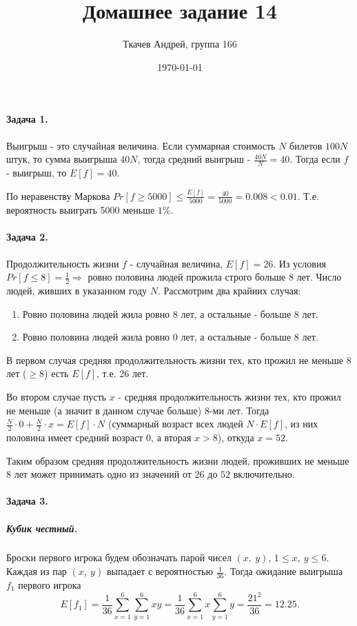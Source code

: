 \documentclass{article}
\title{Домашнее задание 14}
\author{Ткачев Андрей, группа 166}
\date{\today}
\newcommand{\pair}[2]{(#1,\ #2)}
\newcommand{\half}[1]{\frac{#1}{2}}
\begin{document}
	\maketitle
	\paragraph{Задача 1.}

    Выигрыш - это случайная величина. Если суммарная стоимость $N$ билетов $100N$ штук, то сумма выигрыша $40N$, тогда средний выигрыш - $\frac{40N}{N} = 40$. Тогда если $f$ - выигрыш, то $E[f] = 40$.

    По неравенству Маркова $Pr[f \ge 5000] \le \frac{E[f]}{5000} = \frac{40}{5000} = 0.008 < 0.01 $. Т.е. вероятность выиграть 5000 меньше $1\%$.

    \paragraph{Задача 2.}
    Продолжительность жизни $f$ - случайная величина, $E[f] = 26$. Из условия $Pr[f \le 8] = \half{1} \Rightarrow$ ровно половина людей прожила строго больше 8 лет.
    Число людей, живших в указанном году $N$. Рассмотрим два крайних случая:

    \begin{enumerate}
        \item Ровно половина людей жила ровно 8 лет, а остальные - больше 8 лет.
        \item Ровно половина людей жила ровно 0 лет, а остальные - больше 8 лет.
    \end{enumerate}

    В первом случая средняя продолжительность жизни тех, кто прожил не меньше 8 лет ($\ge 8$) есть $E[f]$, т.е. 26 лет.

    Во втором случае пусть $x$ - средняя продолжительность жизни тех, кто прожил не меньше (а значит в данном случае больше) 8-ми лет. Тогда $\half{N} \cdot 0  + \half{N} \cdot x = E[f] \cdot N$ (суммарный возраст всех людей $N \cdot E[f]$, из них половина имеет средний возраст 0, а вторая $x > 8$), откуда $x = 52$.

    Таким образом средняя продолжительность жизни людей, проживших не меньше 8 лет может принимать одно из значений от $26$ до $52$ включительно.

    \paragraph{Задача 3.}
    \subparagraph{Кубик честный.}
    Броски первого игрока будем обозначать парой чисел $(x,\ y)$, $1 \le x,\ y \le 6$. Каждая из пар $\pair{x}{y}$ выпадает с вероятностью $\frac{1}{36}$. Тогда ожидание выигрыша $f_1$ первого игрока 
    $$E[f_1] = \frac{1}{36}\sum_{x=1}^{6}\sum_{y=1}^{6} xy = \frac{1}{36} \sum_{x=1}^{6} x \sum_{y=1}^{6} y = \frac{21^2}{36} = 12.25.$$
\end{document}
